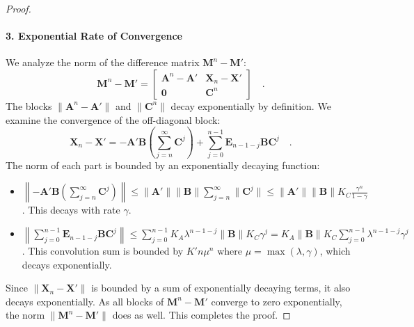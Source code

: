 \documentclass[../../main.tex]{subfiles}
\begin{document}
\begin{proof}
\paragraph{3. Exponential Rate of Convergence}
We analyze the norm of the difference matrix $\bm{M}^n - \bm{M}'$:
\[
    \bm{M}^n - \bm{M}' = 
    \begin{bmatrix}
        \bm{A}^n - \bm{A}' & \bm{X}_n - \bm{X}' \\
        \bm{0} & \bm{C}^n
    \end{bmatrix}
    \quad .
\]
The blocks $\|\bm{A}^n - \bm{A}'\|$ and $\|\bm{C}^n\|$ decay exponentially by definition. We examine the convergence of the off-diagonal block:
\[
    \bm{X}_n - \bm{X}' = -\bm{A}'\bm{B}\left(\sum_{j=n}^{\infty}\bm{C}^j\right) + \sum_{j=0}^{n-1}\bm{E}_{n-1-j}\bm{B}\bm{C}^j \quad .
\]
The norm of each part is bounded by an exponentially decaying function:
\begin{itemize}
    \item $\left\|-\bm{A}'\bm{B}\left(\sum_{j=n}^{\infty}\bm{C}^j\right)\right\| \le \|\bm{A}'\|\|\bm{B}\| \sum_{j=n}^{\infty}\|\bm{C}^j\| \le \|\bm{A}'\|\|\bm{B}\| K_C \frac{\gamma^n}{1-\gamma}$. This decays with rate $\gamma$.
    \item $\left\|\sum_{j=0}^{n-1}\bm{E}_{n-1-j}\bm{B}\bm{C}^j\right\| \le \sum_{j=0}^{n-1} K_A\lambda^{n-1-j} \|\bm{B}\| K_C\gamma^j = K_A \|\bm{B}\| K_C \sum_{j=0}^{n-1} \lambda^{n-1-j} \gamma^j$. This convolution sum is bounded by $K'n\mu^n$ where $\mu = \max(\lambda, \gamma)$, which decays exponentially.
\end{itemize}
Since $\|\bm{X}_n - \bm{X}'\|$ is bounded by a sum of exponentially decaying terms, it also decays exponentially. As all blocks of $\bm{M}^n - \bm{M}'$ converge to zero exponentially, the norm $\|\bm{M}^n - \bm{M}'\|$ does as well. This completes the proof.
\end{proof}

\clearpage
\end{document}
